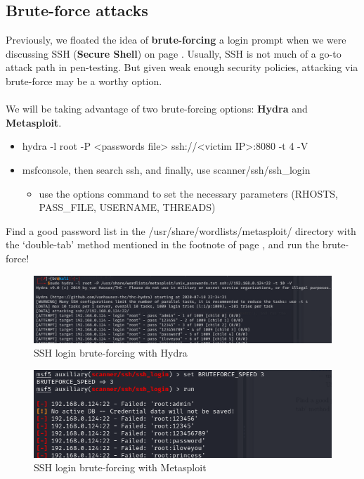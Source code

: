 \documentclass[a4paper,11pt]{article}
\renewcommand{\tt}[2][tt]{\textcolor{#1}{\ttfamily #2}}%
\begin{document}
\subsection{Brute-force attacks}
\label{subsec:bruteforce}

Previously, we floated the idea of {\bfseries brute-forcing} a login prompt when we were discussing SSH ({\bfseries Secure Shell}) on page \pageref{fig:sshk}. Usually, SSH is not much of a go-to attack path in pen-testing. But given weak enough security policies, attacking via brute-force may be a worthy option.
\\
\\
We will be taking advantage of two brute-forcing options: {\bfseries Hydra} and {\bfseries Metasploit}.

\begin{itemize}
    \item \tt{hydra -l root -P <passwords file> ssh://<victim IP>:8080 -t 4 -V}
    \item \tt{msfconsole}, then \tt{search ssh}, and finally, \tt{use scanner/ssh/ssh\_login}
    \begin{itemize}
        \vspace{-0.4cm}
        \item use the \tt{options} command to set the necessary parameters (RHOSTS, PASS\_FILE, USERNAME, THREADS)
    \end{itemize}
\end{itemize}
Find a good password list in the \tt{/usr/share/wordlists/metasploit/} directory with the `double-tab' method mentioned in the footnote of page \pageref{fig:nonstaged-modssl}, and run the brute-force!
\begin{figure}[h]
    \centering
    \includegraphics[width=1\textwidth]{images/hydra-brute-ssh.png}
    \caption{SSH login brute-forcing with Hydra}
    \label{fig:hydra-brute-ssh}
\end{figure}

\begin{figure}[h]
    \centering
    \includegraphics[width=1\textwidth]{images/msf-brute-ssh.png}
    \caption{SSH login brute-forcing with Metasploit}
    \label{fig:msf-brute-ssh}
\end{figure}
\end{document}
